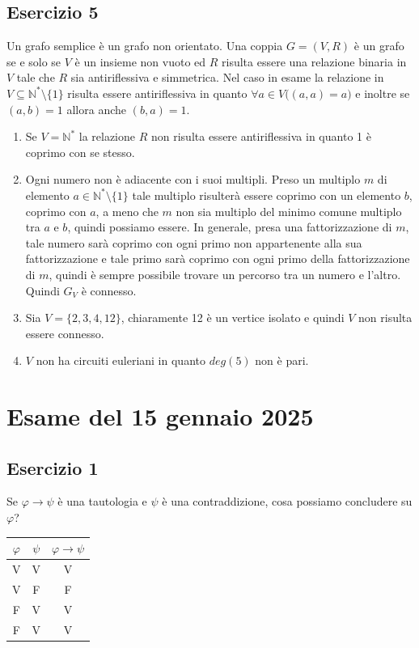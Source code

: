 \subsection*{Esercizio 5}
Un grafo semplice è un grafo non orientato. Una coppia $G=(V,R)$ è un grafo se e solo se $V$ è un insieme non vuoto ed $R$ risulta essere una relazione binaria in $V$ tale che $R$ sia antiriflessiva e simmetrica. Nel caso in esame la relazione in $V \subseteq \mathbb{N}^{*} \setminus \{1\}$ risulta essere antiriflessiva in quanto $\forall a \in V \bigl((a,a)=a\bigr)$ e inoltre se $(a,b)=1$ allora anche $(b,a)=1$.
\begin{enumerate}[label=(\textit{\roman*})]
	\item Se $V=\mathbb{N}^{*}$ la relazione $R$ non risulta essere antiriflessiva in quanto 1 è coprimo con se stesso.
	\item Ogni numero non è adiacente con i suoi multipli. Preso un multiplo $m$ di elemento $a \in \mathbb{N}^{*} \setminus \{1\}$ tale multiplo risulterà essere coprimo con un elemento $b$, coprimo con $a$, a meno che $m$ non sia multiplo del minimo comune multiplo tra $a$ e $b$, quindi possiamo essere. In generale, presa una fattorizzazione di $m$, tale numero sarà coprimo con ogni primo non appartenente alla sua fattorizzazione e tale primo sarà coprimo con ogni primo della fattorizzazione di $m$, quindi è sempre possibile trovare un percorso tra un numero e l'altro. Quindi $G_{V}$ è connesso.
	\item Sia $V=\{2,3,4,12\}$, chiaramente 12 è un vertice isolato e quindi $V$ non risulta essere connesso.
	\item $V$ non ha circuiti euleriani in quanto $deg(5)$ non è pari.
\end{enumerate}

\section{Esame del 15 gennaio 2025}

\subsection*{Esercizio 1}

Se $\varphi \to \psi$ è una tautologia e $\psi$ è una contraddizione, cosa possiamo concludere su $\varphi$?

\begin{center}
\begin{tabular}{c|c|c}
$\varphi$ & $\psi$ & $\varphi \to \psi$ \\
\hline
V & V & V \\
V & F & F \\
F & V & V \\
F & V & V
\end{tabular}
\end{center}

